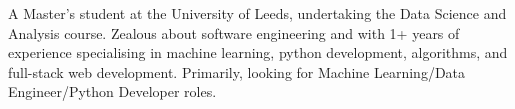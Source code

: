 

\begin{cvparagraph}

A Master’s student at the University of Leeds, undertaking the Data Science and Analysis course. Zealous about software engineering and with 1+ years of experience specialising in machine learning, python development, algorithms, and full-stack web development. Primarily, looking for Machine Learning/Data Engineer/Python Developer roles.
\end{cvparagraph}